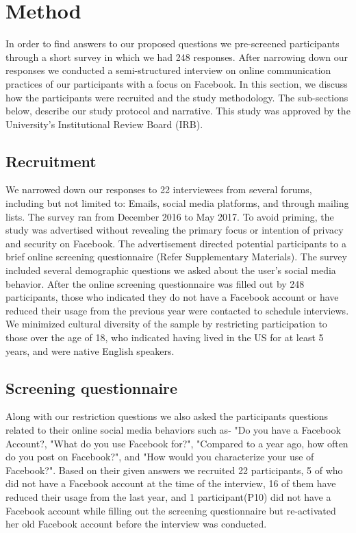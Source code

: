 \section{Method}
\label{sec:method}
In order to find answers to our proposed questions we pre-screened participants through a short survey in which we had 248 responses. After narrowing down our responses we conducted a semi-structured interview on online communication practices of our participants with a focus on Facebook. In this section, we discuss how the participants were recruited and the study methodology. The sub-sections below, describe our study protocol and narrative. This study was approved by the University's Institutional Review Board (IRB).

\subsection{Recruitment}

We narrowed down our responses to 22 interviewees from several forums, including but not limited to:
Emails, social media platforms, and through mailing lists. The survey ran from December 2016 to May 2017. To avoid priming, the study was advertised without revealing the primary focus or intention of privacy and security on Facebook. The advertisement directed potential participants to a brief online screening questionnaire (Refer Supplementary Materials). The survey included several demographic questions we asked about the user's social media behavior. After the online screening questionnaire was filled out by 248 participants, those who indicated they do not have a Facebook account or have reduced their usage from the previous year were contacted to schedule interviews. We minimized cultural diversity of the sample by restricting participation to those over the age of 18, who indicated having lived in the US for at least 5 years, and were native English speakers. 

\subsection{Screening questionnaire}
Along with our restriction questions we also asked the participants questions related to their online social media behaviors such as- "Do you have a Facebook Account?, "What do you use Facebook for?", "Compared to a year ago, how often do you post on Facebook?", and "How would you characterize your use of Facebook?". Based on their given answers we recruited 22 participants, 5 of who did not have a Facebook account at the time of the interview, 16 of them have reduced their usage from the last year, and 1 participant(P10) did not have a Facebook account while filling out the screening questionnaire but re-activated her old Facebook account before the interview was conducted. 

